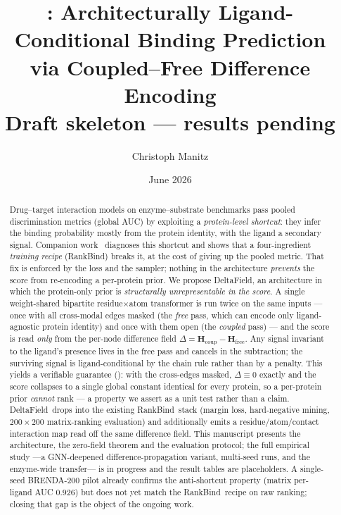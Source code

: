 \documentclass[11pt,a4paper]{article}
\title{\textbf{\df: Architecturally Ligand-Conditional Binding Prediction\\
via Coupled--Free Difference Encoding}\\[4pt]
\large\normalfont\textcolor{red!70!black}{Draft skeleton --- results pending}}
\author[1]{Christoph Manitz}
\affil[1]{Leipzig University, Germany \\
\texttt{christoph.manitz@uni-leipzig.de}}
\date{June 2026}
\newcommand{\df}{DeltaField\xspace}
\newcommand{\method}{RankBind\xspace}
\newcommand{\Hfree}{\mathbf{H}_{\text{free}}}
\newcommand{\Hcoup}{\mathbf{H}_{\text{coup}}}
\begin{document}
\maketitle

\begin{abstract}
Drug--target interaction models on enzyme--substrate benchmarks pass pooled
discrimination metrics (global AUC) by exploiting a \emph{protein-level
shortcut}: they infer the binding probability mostly from the protein
identity, with the ligand a secondary signal. Companion
work~\citep{manitz2026rankbind} diagnoses this shortcut and shows that a
four-ingredient \emph{training recipe} (\method) breaks it, at the cost of
giving up the pooled metric. That fix is enforced by the loss and the
sampler; nothing in the architecture \emph{prevents} the score from
re-encoding a per-protein prior. We propose \df, an architecture in which the
protein-only prior is \emph{structurally unrepresentable in the score}.
A single weight-shared bipartite residue$\times$atom transformer is run twice
on the same inputs --- once with all cross-modal edges masked (the
\emph{free} pass, which can encode only ligand-agnostic protein identity) and
once with them open (the \emph{coupled} pass) --- and the score is read
\emph{only} from the per-node difference field $\Delta = \Hcoup - \Hfree$.
Any signal invariant to the ligand's presence lives in the free pass and
cancels in the subtraction; the surviving signal is ligand-conditional by the
chain rule rather than by a penalty. This yields a verifiable guarantee
(): with the cross-edges masked, $\Delta\equiv0$ exactly
and the score collapses to a single global constant identical for every
protein, so a per-protein prior \emph{cannot} rank --- a property we assert as
a unit test rather than a claim. \df\ drops into the existing \method\ stack
(margin loss, hard-negative mining, $200\times200$ matrix-ranking evaluation)
and additionally emits a residue/atom/contact interaction map read off the
same difference field. This manuscript presents the architecture, the
zero-field theorem and the evaluation protocol; the full empirical study
---a GNN-deepened difference-propagation variant, multi-seed runs, and the
enzyme-wide transfer--- is in progress and the result tables are placeholders.
A single-seed BRENDA-200 pilot already confirms the anti-shortcut property
(matrix per-ligand AUC $0.926$) but does not yet match the \method\ recipe on
raw ranking; closing that gap is the object of the ongoing work.
\end{abstract}
\end{document}
